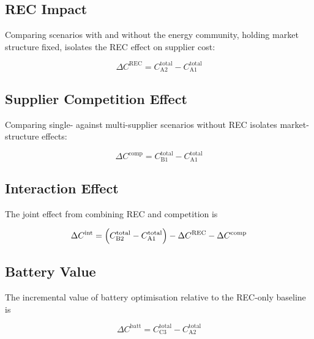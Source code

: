 \documentclass[12pt,a4paper]{article}
\begin{document}
\subsection{REC Impact}

Comparing scenarios with and without the energy community, holding market
structure fixed, isolates the REC effect on supplier cost:

\begin{equation}
\Delta C^{\mathrm{REC}} = C^{\mathrm{total}}_{\text{A2}} - C^{\mathrm{total}}_{\text{A1}}
\label{eq:rec_impact}
\end{equation}

\subsection{Supplier Competition Effect}

Comparing single- against multi-supplier scenarios without REC isolates
market-structure effects:

\begin{equation}
\Delta C^{\mathrm{comp}} = C^{\mathrm{total}}_{\text{B1}} - C^{\mathrm{total}}_{\text{A1}}
\label{eq:competition_impact}
\end{equation}

\subsection{Interaction Effect}

The joint effect from combining REC and competition is

\begin{equation}
\Delta C^{\mathrm{int}} =
  \Bigl(C^{\mathrm{total}}_{\text{B2}} - C^{\mathrm{total}}_{\text{A1}}\Bigr)
  - \Delta C^{\mathrm{REC}} - \Delta C^{\mathrm{comp}}
\label{eq:interaction}
\end{equation}

\subsection{Battery Value}

The incremental value of battery optimisation relative to the REC-only baseline is

\begin{equation}
\Delta C^{\mathrm{batt}} = C^{\mathrm{total}}_{\text{C3}} - C^{\mathrm{total}}_{\text{A2}}
\label{eq:battery_value}
\end{equation}
\end{document}
